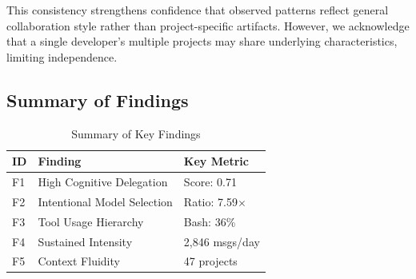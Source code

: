 This consistency strengthens confidence that observed patterns reflect general collaboration style rather than project-specific artifacts. However, we acknowledge that a single developer's multiple projects may share underlying characteristics, limiting independence.

\subsection{Summary of Findings}

\begin{table}[h]
\caption{Summary of Key Findings}
\label{tab:summary}
\begin{tabular}{lll}
\toprule
\textbf{ID} & \textbf{Finding} & \textbf{Key Metric} \\
\midrule
F1 & High Cognitive Delegation & Score: 0.71 \\
F2 & Intentional Model Selection & Ratio: 7.59$\times$ \\
F3 & Tool Usage Hierarchy & Bash: 36\% \\
F4 & Sustained Intensity & 2,846 msgs/day \\
F5 & Context Fluidity & 47 projects \\
\bottomrule
\end{tabular}
\end{table}
